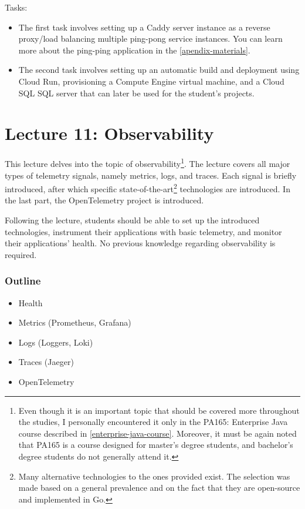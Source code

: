 \documentclass[
  digital,
  color,
  oneside,
  nosansbold,
  nocolorbold,
  nolof,
  nolot,
]{fithesis4}
\begin{document}
\noindent
Tasks:
\begin{itemize}
    \item The first task involves setting up a Caddy server instance as a reverse proxy/load balancing multiple ping-pong service instances. You can learn more about the ping-ping application in the \cref{apendix-materials}.
    \item The second task involves setting up an automatic build and deployment using Cloud Run\cite{gcp-cloud-run}, provisioning a Compute Engine\cite{gcp-cloud-compute} virtual machine, and a Cloud SQL SQL\cite{gcp-cloud-sql} server that can later be used for the student's projects.
\end{itemize}
    
\section{Lecture 11: Observability}\label{lecture-observability}

This lecture delves into the topic of observability\footnote{Even though it is an important topic that should be covered more throughout the studies, I personally encountered it only in the PA165: Enterprise Java course described in \cref{enterprise-java-course}. Moreover, it must be again noted that PA165 is a course designed for master's degree students, and bachelor's degree students do not generally attend it.}. The lecture covers all major types of telemetry signals, namely metrics, logs, and traces. Each signal is briefly introduced, after which specific state-of-the-art\footnote{Many alternative technologies to the ones provided exist. The selection was made based on a general prevalence and on the fact that they are open-source and implemented in Go.}
technologies are introduced. In the last part, the OpenTelemetry\cite{open-telemetry} project is introduced.

Following the lecture, students should be able to set up the introduced technologies, instrument their applications with basic telemetry, and monitor their applications' health. No previous knowledge regarding observability is required.

\subsubsection{Outline}

\begin{itemize}
    \item Health
    \item Metrics (Prometheus, Grafana)
    \item Logs (Loggers, Loki)
    \item Traces (Jaeger)
    \item OpenTelemetry
\end{itemize}
\end{document}
